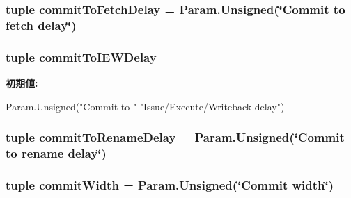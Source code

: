 \label{classOzoneCPU_1_1DerivOzoneCPU_acaab18e678264ee264642b5be0d91157}
\hypertarget{classOzoneCPU_1_1DerivOzoneCPU_aad1963f659c6e9595b5d1ff499e843d8}{
\subsubsection[{commitToFetchDelay}]{\setlength{\rightskip}{0pt plus 5cm}tuple {\bf commitToFetchDelay} = Param.Unsigned(\char`\"{}Commit to fetch delay\char`\"{})}}
\label{classOzoneCPU_1_1DerivOzoneCPU_aad1963f659c6e9595b5d1ff499e843d8}
\hypertarget{classOzoneCPU_1_1DerivOzoneCPU_afc77f4f67ebd047a4af56403975f4464}{
\subsubsection[{commitToIEWDelay}]{\setlength{\rightskip}{0pt plus 5cm}tuple {\bf commitToIEWDelay}}}
\label{classOzoneCPU_1_1DerivOzoneCPU_afc77f4f67ebd047a4af56403975f4464}
{\bfseries 初期値:}
\begin{DoxyCode}
Param.Unsigned("Commit to "
               "Issue/Execute/Writeback delay")
\end{DoxyCode}
\hypertarget{classOzoneCPU_1_1DerivOzoneCPU_a35c9cdaf793827c316dee784cbf39d96}{
\subsubsection[{commitToRenameDelay}]{\setlength{\rightskip}{0pt plus 5cm}tuple {\bf commitToRenameDelay} = Param.Unsigned(\char`\"{}Commit to rename delay\char`\"{})}}
\label{classOzoneCPU_1_1DerivOzoneCPU_a35c9cdaf793827c316dee784cbf39d96}
\hypertarget{classOzoneCPU_1_1DerivOzoneCPU_a3df421018d58bcd7f02c3965f6b43ac3}{
\subsubsection[{commitWidth}]{\setlength{\rightskip}{0pt plus 5cm}tuple {\bf commitWidth} = Param.Unsigned(\char`\"{}Commit {\bf width}\char`\"{})}}

